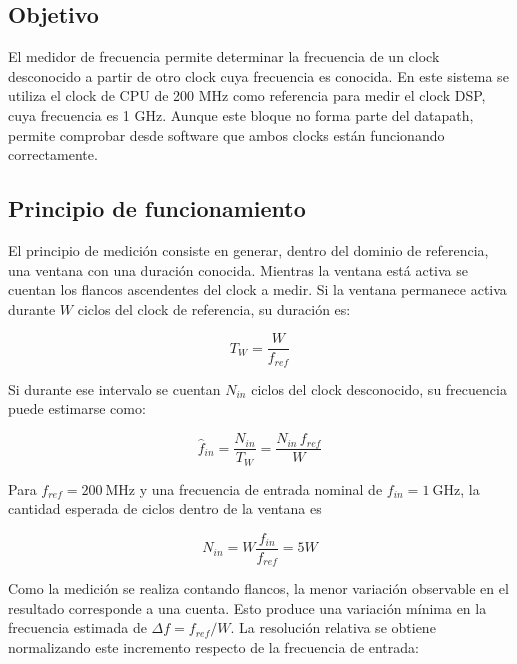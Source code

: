 \documentclass[10pt,a4paper]{article}
\begin{document}
\subsection{Objetivo}

El medidor de frecuencia permite determinar la frecuencia de un clock desconocido a
partir de otro clock cuya frecuencia es conocida. En este sistema se utiliza el clock
de CPU de 200 MHz como referencia para medir el clock DSP, cuya frecuencia es
1 GHz. Aunque este bloque no forma parte del datapath, permite comprobar desde 
software que ambos clocks están funcionando correctamente.

\subsection{Principio de funcionamiento}

El principio de medición consiste en generar, dentro del dominio de referencia, una
ventana con una duración conocida. Mientras la ventana está activa se cuentan los
flancos ascendentes del clock a medir. Si la ventana permanece activa durante
$W$ ciclos del clock de referencia, su duración es:

\begin{equation}
    T_W=\frac{W}{f_{ref}}
    \label{eq:freq-window-time}
\end{equation}

Si durante ese intervalo se cuentan $N_{in}$ ciclos del clock desconocido, su
frecuencia puede estimarse como:

\begin{equation}
    \widehat{f}_{in}=\frac{N_{in}}{T_W}
    =\frac{N_{in}\,f_{ref}}{W}
    \label{eq:freq-estimation}
\end{equation}

Para $f_{ref}=200\ \text{MHz}$ y una frecuencia de entrada nominal de
$f_{in}=1\ \text{GHz}$, la cantidad esperada de ciclos dentro de la ventana es

\begin{equation}
    N_{in}=W\frac{f_{in}}{f_{ref}}=5W
    \label{eq:freq-expected-count}
\end{equation}


Como la medición se realiza contando flancos, la menor variación observable en el
resultado corresponde a una cuenta. Esto produce una variación mínima en la 
frecuencia estimada de $\Delta f=f_{ref}/{W}$. La resolución relativa 
se obtiene normalizando este incremento respecto de la frecuencia de entrada:
\end{document}

